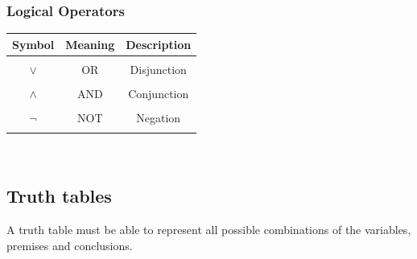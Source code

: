 \documentclass[../setup.tex]{subfiles}
\begin{document}
\subsubsection{Logical Operators}
{
\centering
\begin{tabular}{| c | c | c |}
\hline
Symbol & Meaning & Description \\
\hline
& & \\
$\lor$ & OR & Disjunction \\
& & \\
$\land$ & AND & Conjunction \\
& & \\
$\lnot$ & NOT & Negation \\
& & \\
\hline
\end{tabular} \\
}



\subsection{Truth tables}
A truth table must be able to represent all possible combinations of the variables, premises and conclusions.\\
\\
\end{document}

